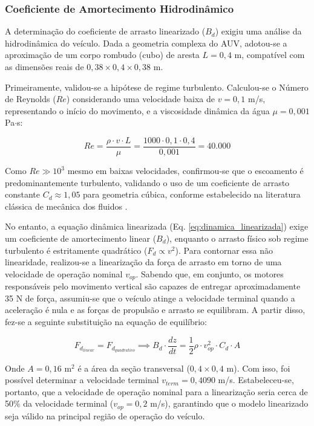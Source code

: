 \documentclass[12pt, a4paper]{article}
\begin{document}
			\subsubsection{Coeficiente de Amortecimento Hidrodinâmico}

				A determinação do coeficiente de arrasto linearizado ($B_d$) exigiu uma análise da hidrodinâmica do veículo. Dada a geometria complexa do AUV, adotou-se a aproximação de um corpo rombudo (cubo) de aresta $L = 0,4$ m, compatível com as dimensões reais de $0,38 \times 0,4 \times 0,38$ m.  

				Primeiramente, validou-se a hipótese de regime turbulento. Calculou-se o Número de Reynolds ($Re$) considerando uma velocidade baixa de $v = 0,1$ m/s, representando o início do movimento, e a viscosidade dinâmica da água $\mu = 0,001$ Pa$\cdot$s:

				\begin{equation}
					Re = \frac{\rho \cdot v \cdot L}{\mu} = \frac{1000 \cdot 0,1 \cdot 0,4}{0,001} = 40.000
				\end{equation}

				Como $Re \gg 10^3$ mesmo em baixas velocidades, confirmou-se que o escoamento é predominantemente turbulento, validando o uso de um coeficiente de arrasto constante $C_d \approx 1,05$ para geometria cúbica, conforme estabelecido na literatura clássica de mecânica dos fluidos \cite{fox}.

				No entanto, a equação dinâmica linearizada (Eq. \ref{eq:dinamica_linearizada}) exige um coeficiente de amortecimento linear ($B_d$), enquanto o arrasto físico sob regime turbulento é estritamente quadrático ($F_d \propto v^2$). Para contornar essa não linearidade, realizou-se a linearização da força de arrasto em torno de uma velocidade de operação nominal $v_{op}$. Sabendo que, em conjunto, os motores responsáveis pelo movimento vertical são capazes de entregar aproximadamente 35 N de força, assumiu-se que o veículo atinge a velocidade terminal quando a aceleração é nula e as forças de propulsão e arrasto se equilibram. A partir disso, fez-se a seguinte substituição na equação de equilíbrio:

				\begin{equation}
					F_{d_{linear}} = F_{d_{quadratico}} \implies B_d \cdot \frac{dz}{dt} = \frac{1}{2} \rho \cdot v_{op}^2 \cdot C_d \cdot A
					\label{eq:linearizacao_arrasto}
				\end{equation}

				Onde $A = 0,16$ m$^2$ é a área da seção transversal ($0,4 \times 0,4$ m). Com isso, foi possível determinar a velocidade terminal $v_{term} = 0,4090$ m/s. Estabeleceu-se, portanto, que a velocidade de operação nominal para a linearização seria cerca de 50\% da velocidade terminal ($v_{op} = 0,2$ m/s), garantindo que o modelo linearizado seja válido na principal região de operação do veículo.
\end{document}
